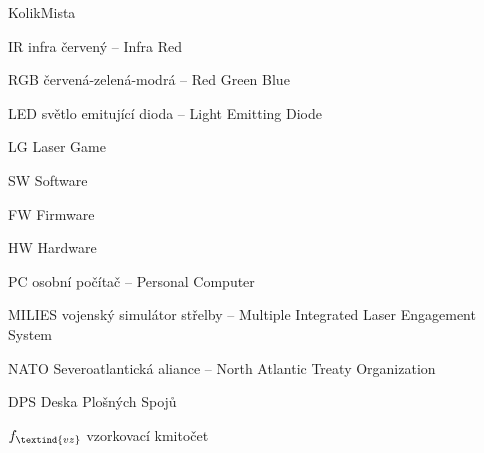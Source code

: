 \begin{seznamzkratek}{KolikMista}

        {IR}
        {infra červený -- Infra Red}

        {RGB}
        {červená-zelená-modrá -- Red Green Blue}

        {LED}
        {světlo emitující dioda -- Light Emitting Diode}

        {LG}
        {Laser Game}

        {SW}
        {Software}

        {FW}
        {Firmware}

        {HW}
        {Hardware}

        {PC}
        {osobní počítač -- Personal Computer}

        {MILIES}
        {vojenský simulátor střelby -- Multiple Integrated Laser Engagement System}

        {NATO}
        {Severoatlantická aliance -- North Atlantic Treaty Organization}

        {DPS}
        {Deska Plošných Spojů}

        {\ensuremath{f_\textind{vz}}}
        {vzorkovací kmitočet}

\end{seznamzkratek}

